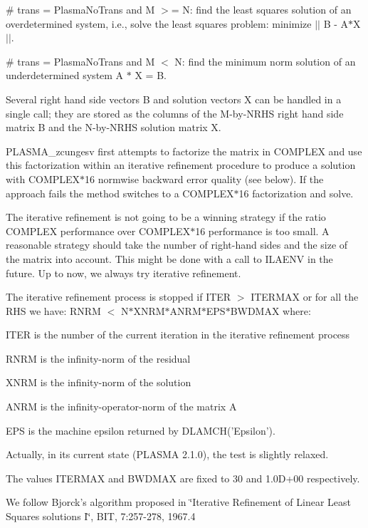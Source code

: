 \# trans = PlasmaNoTrans and M $>$= N: find the least squares solution of an overdetermined system, i.e., solve the least squares problem: minimize $|$$|$ B -\/ A$\ast$X $|$$|$.

\# trans = PlasmaNoTrans and M $<$ N: find the minimum norm solution of an underdetermined system A $\ast$ X = B.

Several right hand side vectors B and solution vectors X can be handled in a single call; they are stored as the columns of the M-\/by-\/NRHS right hand side matrix B and the N-\/by-\/NRHS solution matrix X.

PLASMA\_\-zcungesv first attempts to factorize the matrix in COMPLEX and use this factorization within an iterative refinement procedure to produce a solution with COMPLEX$\ast$16 normwise backward error quality (see below). If the approach fails the method switches to a COMPLEX$\ast$16 factorization and solve.

The iterative refinement is not going to be a winning strategy if the ratio COMPLEX performance over COMPLEX$\ast$16 performance is too small. A reasonable strategy should take the number of right-\/hand sides and the size of the matrix into account. This might be done with a call to ILAENV in the future. Up to now, we always try iterative refinement.

The iterative refinement process is stopped if ITER $>$ ITERMAX or for all the RHS we have: RNRM $<$ N$\ast$XNRM$\ast$ANRM$\ast$EPS$\ast$BWDMAX where:


\begin{DoxyItemize}
\item ITER is the number of the current iteration in the iterative refinement process
\item RNRM is the infinity-\/norm of the residual
\item XNRM is the infinity-\/norm of the solution
\item ANRM is the infinity-\/operator-\/norm of the matrix A
\item EPS is the machine epsilon returned by DLAMCH('Epsilon').
\end{DoxyItemize}

Actually, in its current state (PLASMA 2.1.0), the test is slightly relaxed.

The values ITERMAX and BWDMAX are fixed to 30 and 1.0D+00 respectively.

We follow Bjorck's algorithm proposed in \char`\"{}Iterative Refinement of Linear
  Least Squares solutions I\char`\"{}, BIT, 7:257-\/278, 1967.4


